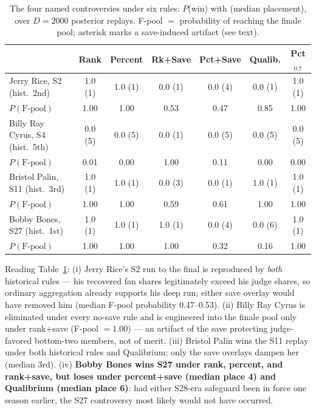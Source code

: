 \documentclass[11pt]{article}
\begin{document}
\begin{table}[H]
\centering
\caption{The four named controversies under six rules: $P$(win) with (median
placement), over $D=2000$ posterior replays. F-pool $=$ probability of reaching
the finale pool; asterisk marks a save-induced artifact (see text).}
\label{tab:controversies}
\small
\begin{tabular}{lcccccc}
\toprule
 & Rank & Percent & Rk+Save & Pct+Save & Qualib. & Pct$_{0.7}$ \\
\midrule
Jerry Rice, S2 (hist.\ 2nd) & 1.0 (1) & 1.0 (1) & 0.0 (1) & 0.0 (4) & 0.0 (1) & 1.0 (1) \\
\quad $P(\text{F-pool})$ & 1.00 & 1.00 & 0.53 & 0.47 & 0.85 & 1.00 \\
\addlinespace
Billy Ray Cyrus, S4 (hist.\ 5th) & 0.0 (5) & 0.0 (5) & 0.0 (1) & 0.0 (5) & 0.0 (5) & 0.0 (5) \\
\quad $P(\text{F-pool})$ & 0.01 & 0.00 & 1.00 & 0.11 & 0.00 & 0.00 \\
\addlinespace
Bristol Palin, S11 (hist.\ 3rd) & 1.0 (1) & 1.0 (1) & 0.0 (3) & 0.0 (1) & 1.0 (1) & 1.0 (1) \\
\quad $P(\text{F-pool})$ & 1.00 & 1.00 & 0.59 & 0.61 & 1.00 & 1.00 \\
\addlinespace
Bobby Bones, S27 (hist.\ 1st) & 1.0 (1) & 1.0 (1) & 1.0 (1) & 0.0 (4) & 0.0 (6) & 1.0 (1) \\
\quad $P(\text{F-pool})$ & 1.00 & 1.00 & 1.00 & 0.32 & 0.16 & 1.00 \\
\bottomrule
\end{tabular}
\end{table}

Reading Table~\ref{tab:controversies}: (i) Jerry Rice's S2 run to the final is
reproduced by \emph{both} historical rules --- his recovered fan shares
legitimately exceed his judge shares, so ordinary aggregation already supports his
deep run; either save overlay would have removed him (median F-pool probability
0.47--0.53). (ii) Billy Ray Cyrus is eliminated under every no-save rule and is
engineered into the finale pool only under rank+save (F-pool $= 1.00$) --- an
artifact of the save protecting judge-favored bottom-two members, not of merit.
(iii) Bristol Palin wins the S11 replay under both historical rules and Qualibrium;
only the save overlays dampen her (median 3rd). (iv) \textbf{Bobby Bones wins S27
under rank, percent, and rank+save, but loses under percent+save (median place 4)
and Qualibrium (median place 6)}: had either S28-era safeguard been in force one
season earlier, the S27 controversy most likely would not have occurred.
\end{document}
